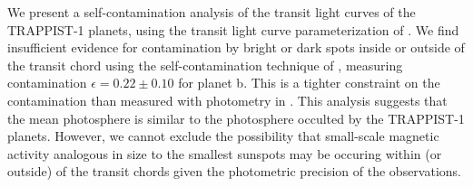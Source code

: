 We present a self-contamination analysis of the \spitzer transit light curves of the TRAPPIST-1 planets, using the transit light curve parameterization of \citet{Morris2018f}. We find insufficient evidence for contamination by bright or dark spots inside or outside of the transit chord using the self-contamination technique of \citet{Morris2018f}, measuring contamination $\epsilon = 0.22 \pm 0.10$ for planet b. This is a tighter constraint on the contamination than measured with \kepler photometry in \citet{Morris2018f}. This analysis suggests that the mean photosphere is similar to the photosphere occulted by the TRAPPIST-1 planets. However, we cannot exclude the possibility that small-scale magnetic activity analogous in size to the smallest sunspots may be occuring within (or outside) of the transit chords given the photometric precision of the \spitzer observations.   

%
%
%
%
%
%
%
